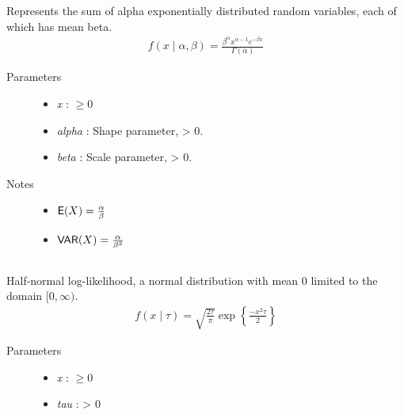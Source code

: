 \documentclass[]{jss}
\begin{document}
Represents the sum of alpha exponentially distributed random variables, each
of which has mean beta.
\begin{eqnarray*}
f(x \mid \alpha, \beta) = \frac{\beta^{\alpha}x^{\alpha-1}e^{-\beta x}}{\Gamma(\alpha)}    
\end{eqnarray*}
\begin{description}
\item[Parameters] \leavevmode\begin{itemize}
\item {} 
\emph{x} : $\ge 0$

\item {} 
\emph{alpha} : Shape parameter, \textgreater{} 0.

\item {} 
\emph{beta} : Scale parameter, \textgreater{} 0.

\end{itemize}

\item[Notes]\leavevmode\begin{itemize}
\item {} 
$\mathsf{E}(X) = \frac{\alpha}{\beta}$

\item {} 
$\mathsf{VAR}(X) = \frac{\alpha}{\beta^2}$

\end{itemize}

\end{description}

\subsection[half normal]{ }

Half-normal log-likelihood, a normal distribution with mean 0 limited
to the domain $[0, \infty)$.
\begin{eqnarray*}
f(x \mid \tau) = \sqrt{\frac{2\tau}{\pi}}\exp\left\{ {\frac{-x^2 \tau}{2}}\right\}    
\end{eqnarray*}
\begin{description}
\item[Parameters] \leavevmode\begin{itemize}
\item {} 
\emph{x} : $\ge 0$

\item {} 
\emph{tau} : \textgreater{} 0

\end{itemize}

\end{description}
\end{document}
